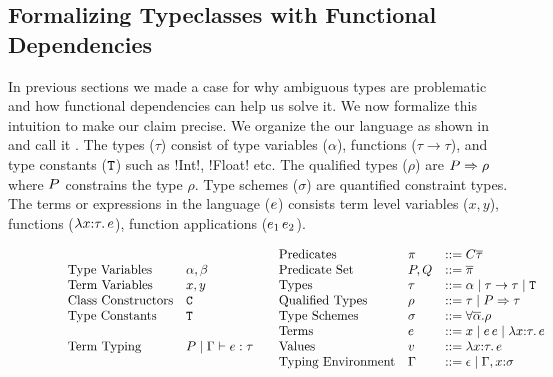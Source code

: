 \documentclass[format=acmsmall,manuscript,review,screen,nonacm,margin=1in,11pt]{acmart}
\begin{document}
\subsection{Formalizing Typeclasses with Functional Dependencies}\label{subsec:tc-formal}
In previous sections we made a case for why ambiguous types are problematic and how
functional dependencies can help us solve it. We now formalize this intuition to make our claim precise.
We organize the our language as shown in  and call it \TCFD.
The types ($\tau$) consist of type variables ($\alpha$), functions ($\tau\to\tau$), and type constants
($\texttt{T}$) such as !Int!, !Float! etc. The qualified types ($\rho$) are $P\Rightarrow\rho$
where $P$ constrains the type $\rho$. Type schemes ($\sigma$) are quantified constraint types.
The terms or expressions in the language ($e$) consists term level variables ($x, y$),
functions ($\lambda x{:}\tau.\, e$), function applications ($e_1\, e_2$).

\begin{figure}[ht]
    \small
  \[
  \begin{array}{l l l}
    &\text{Type Variables}     &\alpha, \beta\\
    &\text{Term Variables}     &x, y\\
    &\text{Class Constructors} &\texttt{C}\\
    &\text{Type Constants}  &\texttt{T}\\    
    \\
    &\text{Term Typing}        &P \mid \Gamma \vdash e : \tau\\
  \end{array}
  \begin{array}{l l l l}
    &\text{Predicates}      &\pi               &\mathrel{{:}{:}{=}} C\overline{\tau}\\
    &\text{Predicate Set}   &P,Q &\mathrel{{:}{:}{=}} \overline{\pi}\\
    &\text{Types}           &\tau              &\mathrel{{:}{:}{=}} \alpha \mathrel{\mid} \tau\to\tau \mathrel{\mid} \texttt{T}\\
    &\text{Qualified Types} &\rho              &\mathrel{{:}{:}{=}} \tau \mathrel{\mid} P\Rightarrow\tau\\
    &\text{Type Schemes}    &\sigma            &\mathrel{{:}{:}{=}} \forall{\overline{\alpha}}.\rho\\
    &\text{Terms}           &e               &\mathrel{{:}{:}{=}} x \mathrel{\mid} e\,e \mathrel{\mid} \lambda x{:}\tau.\, e\\
    &\text{Values}          &v              &\mathrel{{:}{:}{=}} \lambda x{:}\tau.\, e
    \\
    &\text{Typing Environment} &\Gamma &\mathrel{{:}{:}{=}} \epsilon \mathrel{\mid} \Gamma,x{:}\sigma
  \end{array}
  \]
  \caption[\TCFD]{\TCFD}
  \label{fig:tcfd-syntax}
\end{figure}
\end{document}
